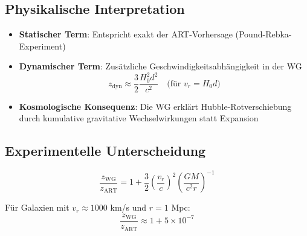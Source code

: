 \subsection{Physikalische Interpretation}
\begin{itemize}
\item \textbf{Statischer Term}: Entspricht exakt der ART-Vorhersage (Pound-Rebka-Experiment)
\item \textbf{Dynamischer Term}: Zusätzliche Geschwindigkeitsabhängigkeit in der WG
\begin{equation}
z_\text{dyn} \approx \frac{3}{2}\frac{H_0^2 d^2}{c^2} \quad \text{(für $v_r = H_0 d$)}
\end{equation}
\item \textbf{Kosmologische Konsequenz}: Die WG erklärt Hubble-Rotverschiebung durch kumulative gravitative Wechselwirkungen statt Expansion
\end{itemize}

\subsection{Experimentelle Unterscheidung}
\begin{equation}
\frac{z_\text{WG}}{z_\text{ART}} = 1 + \frac{3}{2}\left(\frac{v_r}{c}\right)^2 \left(\frac{GM}{c^2r}\right)^{-1}
\end{equation}

Für Galaxien mit $v_r \approx 1000$ km/s und $r=1$ Mpc:
\[
\frac{z_\text{WG}}{z_\text{ART}} \approx 1 + 5\times10^{-7}
\]
